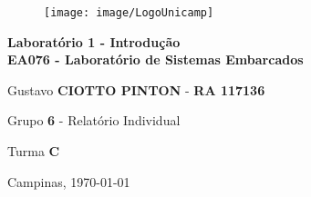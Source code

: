 \begin{titlepage}
\vspace*{.28\textheight}
\begin{center}
%
\begin{figure}[h]
    \centering
    \texttt{[image: image/LogoUnicamp]}
\end{figure} 
%
\vspace*{10pt}
\textbf{\LARGE Laboratório 1 - Introdução} \\ \vspace{12pt}
\textbf{\large EA076 - Laboratório de Sistemas Embarcados}
\vspace*{72pt}

Gustavo \textbf{CIOTTO PINTON} - \textbf{RA 117136}

Grupo \textbf{6} - Relatório Individual

Turma \textbf{C}
 
\vspace{36pt}
Campinas, \today

\end{center}
\end{titlepage}

\newpage